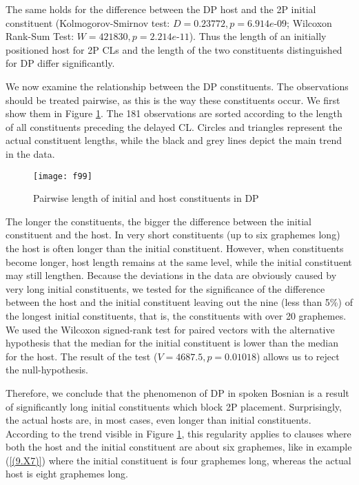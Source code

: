 The same holds for the difference between the DP host and the 2P initial constituent (Kolmogorov-Smirnov test: $D = 0.23772, p = 6.914e\text{-}09$; Wilcoxon Rank-Sum Test: $W = 421830, p = 2.214e\text{-}11$). Thus the length of an initially positioned host for 2P CLs and the length of the two constituents distinguished for DP differ significantly.

We now examine the relationship between the DP constituents. The observations should be treated pairwise, as this is the way these constituents occur. We first show them in Figure \ref{F.9.9}. The 181 observations are sorted according to the length of all constituents preceding the delayed CL. Circles and triangles represent the actual constituent lengths, while the black and grey lines depict the main trend in the data.

\begin{figure}
\caption{Pairwise length of initial and host constituents in DP}
\label{F.9.9}
\texttt{[image: f99]}
\end{figure}

The longer the constituents, the bigger the difference between the initial constituent and the host. In very short constituents (up to six graphemes long) the host is often longer than the initial constituent. However, when constituents become longer, host length remains at the same level, while the initial constituent may still lengthen. Because the deviations in the data are obviously caused by very long initial constituents, we tested for the significance of the difference between the host and the initial constituent leaving out the nine (less than 5\%) of the longest initial constituents, that is, the constituents with over 20 graphemes. We used the Wilcoxon signed-rank test for paired vectors with the alternative hypothesis that the median for the initial constituent is lower than the median for the host. The result of the test ($V = 4687.5, p = 0.01018$) allows us to reject the null-hypothesis.

Therefore, we conclude that the phenomenon of DP in spoken Bosnian is a result of significantly long initial constituents which block 2P placement. Surprisingly, the actual hosts are, in most cases, even longer than initial constituents. According to the trend visible in Figure \ref{F.9.9}, this regularity applies to clauses where both the host and the initial constituent are about six graphemes, like in example (\ref{(9.X7)}) where the initial constituent is four graphemes long, whereas the actual host is eight graphemes long. 

